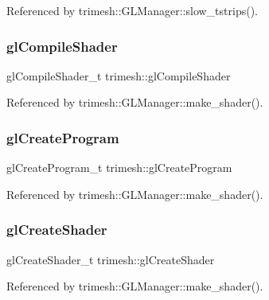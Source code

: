 Referenced by trimesh\+::\+G\+L\+Manager\+::slow\+\_\+tstrips().

\mbox{\label{namespacetrimesh_abe68cbd966de6a948bb2f6411953ec60}} 
\subsubsection{\texorpdfstring{gl\+Compile\+Shader}{glCompileShader}}
{\footnotesize\ttfamily gl\+Compile\+Shader\+\_\+t trimesh\+::gl\+Compile\+Shader\hspace{0.3cm}{\ttfamily [static]}}



Referenced by trimesh\+::\+G\+L\+Manager\+::make\+\_\+shader().

\mbox{\label{namespacetrimesh_a2a9405ef1402a7403cedfa163a1f301e}} 
\subsubsection{\texorpdfstring{gl\+Create\+Program}{glCreateProgram}}
{\footnotesize\ttfamily gl\+Create\+Program\+\_\+t trimesh\+::gl\+Create\+Program\hspace{0.3cm}{\ttfamily [static]}}



Referenced by trimesh\+::\+G\+L\+Manager\+::make\+\_\+shader().

\mbox{\label{namespacetrimesh_a3be2581b68b54314d52f5fee9c07f0b6}} 
\subsubsection{\texorpdfstring{gl\+Create\+Shader}{glCreateShader}}
{\footnotesize\ttfamily gl\+Create\+Shader\+\_\+t trimesh\+::gl\+Create\+Shader\hspace{0.3cm}{\ttfamily [static]}}



Referenced by trimesh\+::\+G\+L\+Manager\+::make\+\_\+shader().

